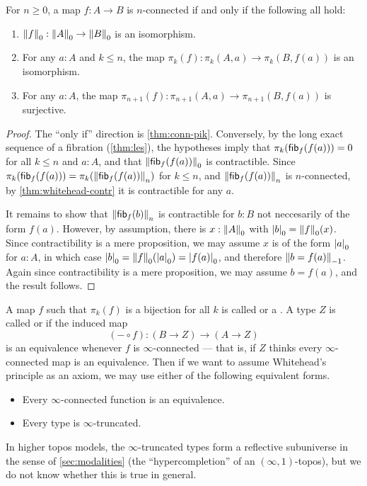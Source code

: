 \begin{cor}\label{thm:pik-conn}
  For $n\ge 0$, a map $f:A\to B$ is $n$-connected if and only if the following all hold:
  \begin{enumerate}
  \item $\trunc0f:\trunc0A \to \trunc0B$ is an isomorphism.
  \item For any $a:A$ and $k\le n$, the map $\pi_k(f):\pi_k(A,a) \to \pi_k(B,f(a))$ is an isomorphism.
  \item For any $a:A$, the map $\pi_{n+1}(f):\pi_{n+1}(A,a) \to \pi_{n+1}(B,f(a))$ is surjective.
  \end{enumerate}
\end{cor}
\begin{proof}
  The ``only if'' direction is \autoref{thm:conn-pik}.
  Conversely, by the long exact sequence of a fibration (\autoref{thm:les}),
  the hypotheses imply that $\pi_k(\hfib f {f(a)})=0$ for all $k\le n$ and $a:A$, and that $\trunc 0{\hfib f{f(a)}}$ is contractible.
  Since $\pi_k(\hfib f {f(a)}) = \pi_k(\trunc n{\hfib f{f(a)}})$ for $k\le n$, and $\trunc n{\hfib f{f(a)}}$ is $n$-connected, by \autoref{thm:whitehead-contr} it is contractible for any $a$.

  It remains to show that $\trunc n{\hfib f{b}}$ is contractible for $b:B$ not neccesarily of the form $f(a)$.
  However, by assumption, there is $x:\trunc0A$ with $\tproj 0b = \trunc0f(x)$.
  Since contractibility is a mere proposition, we may assume $x$ is of the form $\tproj0a$ for $a:A$, in which case $\tproj 0 b = \trunc0f(\tproj0a) = \tproj0{f(a)}$, and therefore $\trunc{-1}{b=f(a)}$.
  Again since contractibility is a mere proposition, we may assume $b=f(a)$, and the result follows.
\end{proof}

A map $f$ such that $\pi_k(f)$ is a bijection for all $k$ is called %
%
or a .%
%
A type $Z$ is called %
%
or %
%
if the induced map
\[(-\circ f):(B\to Z) \to (A\to Z)\]
is an equivalence whenever $f$ is $\infty$-connected --- that is, if $Z$ thinks every $\infty$-connected map is an equivalence.
%
Then if we want to assume Whitehead's principle as an axiom, we may use either of the following equivalent forms.
\begin{itemize}
\item Every $\infty$-connected function is an equivalence.
\item Every type is $\infty$-truncated.
\end{itemize}
In higher topos models,
%
the $\infty$-truncated types form a reflective subuniverse in the sense of 
\autoref{sec:modalities} (the ``hypercompletion'' of an $(\infty,1)$-topos), but we do not know whether this is 
true in general.

